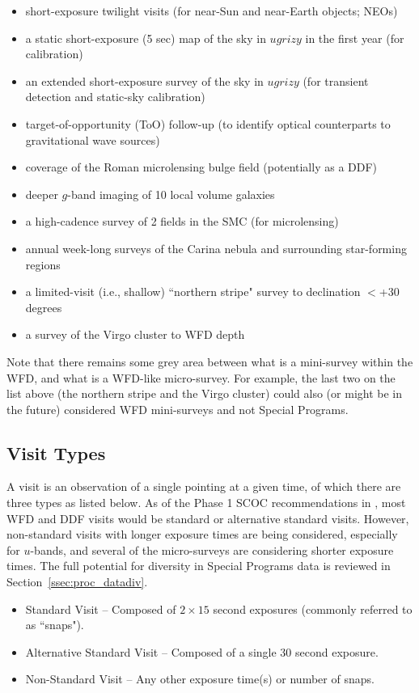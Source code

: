 \documentclass[DM,lsstdoc,toc]{lsstdoc}
\begin{document}
\begin{itemize}
\item short-exposure twilight visits (for near-Sun and near-Earth objects; NEOs)
\item a static short-exposure (5 sec) map of the sky in $ugrizy$ in the first year (for calibration)
\item an extended short-exposure survey of the sky in $ugrizy$ (for transient detection and static-sky calibration)
\item target-of-opportunity (ToO) follow-up (to identify optical counterparts to gravitational wave sources)
\item coverage of the Roman microlensing bulge field (potentially as a DDF)
\item deeper $g$-band imaging of 10 local volume galaxies
\item a high-cadence survey of 2 fields in the SMC (for microlensing)
\item annual week-long surveys of the Carina nebula and surrounding star-forming regions
\item a limited-visit (i.e., shallow) ``northern stripe" survey to declination $<$+30 degrees
\item a survey of the Virgo cluster to WFD depth
\end{itemize}

Note that there remains some grey area between what is a mini-survey within the WFD, and what is a WFD-like micro-survey.
For example, the last two on the list above (the northern stripe and the Virgo cluster) could also (or might be in the future) considered WFD mini-surveys and not Special Programs.

\subsection{Visit Types}\label{ssec:terms_visits}
A visit is an observation of a single pointing at a given time, of which there are three types as listed below.
As of the Phase 1 SCOC recommendations in , most WFD and DDF visits would be standard or alternative standard visits.
However, non-standard visits with longer exposure times are being considered, especially for $u$-bands, and several of the micro-surveys are considering shorter exposure times.
The full potential for diversity in Special Programs data is reviewed in Section~\ref{ssec:proc_datadiv}.

\begin{itemize}
\item Standard Visit -- Composed of $2\times15$ second exposures (commonly referred to as ``snaps").
\item Alternative Standard Visit -- Composed of a single $30$ second exposure.
\item Non-Standard Visit -- Any other exposure time(s) or number of snaps.
\end{itemize}
\end{document}
